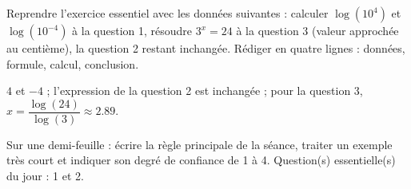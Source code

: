
\begin{homework}Reprendre l'exercice essentiel avec les données suivantes : calculer $\log(10^{4})$ et $\log(10^{-4})$ à la question 1, résoudre $3^x=24$ à la question 3 (valeur approchée au centième), la question 2 restant inchangée. Rédiger en quatre lignes : données, formule, calcul, conclusion.\end{homework}
\begin{solution}$4$ et $-4$ ; l'expression de la question 2 est inchangée ; pour la question 3, $x=\dfrac{\log(24)}{\log(3)}\approx\num{2,89}$.\end{solution}

\begin{exitticket}[3 minutes]Sur une demi-feuille : écrire la règle principale de la séance, traiter un exemple très court et indiquer son degré de confiance de 1 à 4. Question(s) essentielle(s) du jour : 1 et 2.\end{exitticket}

